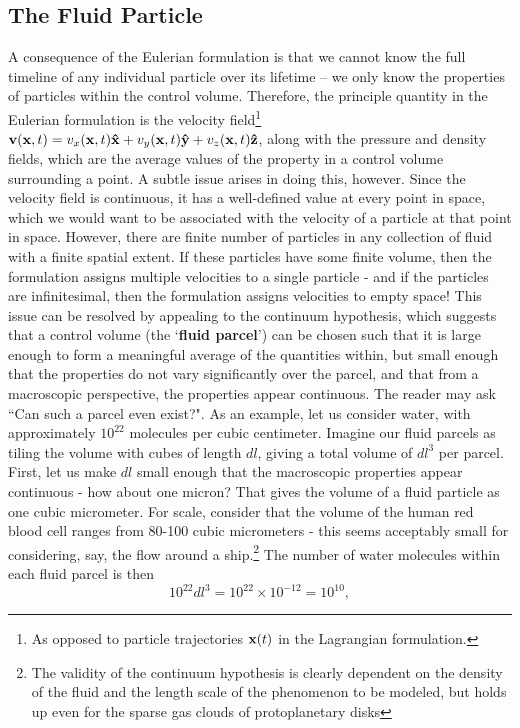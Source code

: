 \subsection{The Fluid Particle}
A consequence of the Eulerian formulation is that we cannot know the full timeline of any individual particle over its lifetime -- we only know the properties of particles within the control volume. Therefore, the principle quantity in the Eulerian formulation is the {velocity field}\footnote{As opposed to particle trajectories $\mathbf{x}(t)$ in the Lagrangian formulation.} $\mathbf{v}(\mathbf{x},t) = v_x(\mathbf{x},t) \mathbf{\hat{x}} + v_y (\mathbf{x},t)\mathbf{\hat{y}} + v_z(\mathbf{x},t) \mathbf{\hat{z}}$, along with the pressure and density fields, which are the average values of the property in a control volume surrounding a point. A subtle issue arises in doing this, however. Since the velocity field is continuous, it has a well-defined value at every point in space, which we would want to be associated with the velocity of a particle at that point in space. However, there are finite number of particles in any collection of fluid with a finite spatial extent. If these particles have some finite volume, then the formulation assigns multiple velocities to a single particle - and if the particles are infinitesimal, then the formulation assigns velocities to empty space! This issue can be resolved by appealing to the continuum hypothesis, which suggests that a control volume (the `{\bf fluid parcel}') can be chosen such that it is large enough to form a meaningful average of the quantities within, but small enough that the properties do not vary significantly over the parcel, and that from a macroscopic perspective, the properties appear continuous. 
The reader may ask ``Can such a  parcel even exist?". As an example, let us consider water, with approximately $10^{22}$ molecules per cubic centimeter. Imagine our fluid parcels as tiling the volume with cubes of length $dl$, giving a total volume of $dl^3$ per parcel. First, let us make $dl$ small enough that the macroscopic properties appear continuous - how about one micron? That gives the volume of a fluid particle as one cubic micrometer. For scale, consider that the volume of the human red blood cell ranges from 80-100 cubic micrometers\cite{Fischer1983} - this seems acceptably small for considering, say, the flow around a ship.\footnote{The validity of the continuum hypothesis is clearly dependent on the density of the fluid and the length scale of the phenomenon to be modeled, but holds up even for the sparse gas clouds of protoplanetary disks} The number of water molecules within each fluid parcel is then 
\begin{equation}
10^{22}dl^3 = 10^{22} \times 10^{-12} = 10^{10},
\end{equation}   

